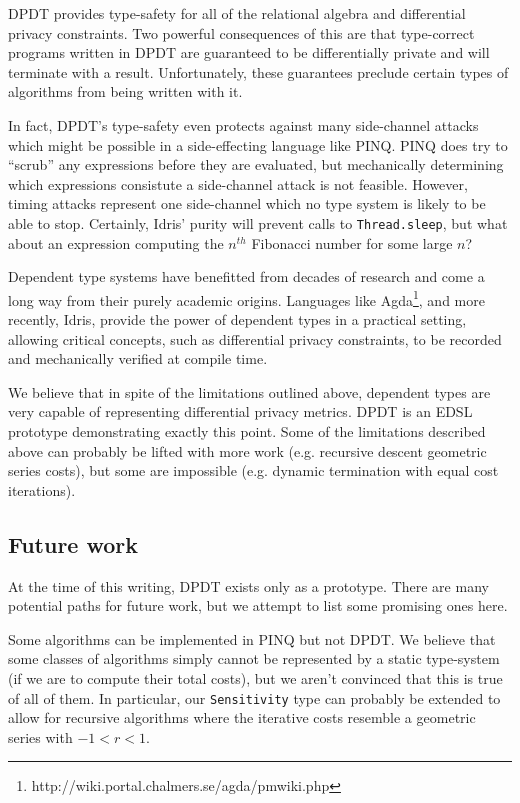 \documentclass[12pt]{article}
\begin{document}
DPDT provides type-safety for all of the relational algebra and differential privacy constraints.
Two powerful consequences of this are that type-correct programs written in DPDT are guaranteed to be differentially private and will terminate with a result.
Unfortunately, these guarantees preclude certain types of algorithms from being written with it.

In fact, DPDT's type-safety even protects against many side-channel attacks which might be possible in a side-effecting language like PINQ.
PINQ does try to ``scrub'' any expressions before they are evaluated, but mechanically determining which expressions consistute a side-channel attack is not feasible.
However, timing attacks represent one side-channel which no type system is likely to be able to stop.
Certainly, Idris' purity will prevent calls to \texttt{Thread.sleep}, but what about an expression computing the $n^{th}$ Fibonacci number for some large $n$?

Dependent type systems have benefitted from decades of research and come a long way from their purely academic origins.
Languages like Agda\footnote{http://wiki.portal.chalmers.se/agda/pmwiki.php}, and more recently, Idris, provide the power of dependent types in a practical setting, allowing critical concepts, such as differential privacy constraints, to be recorded and mechanically verified at compile time.

We believe that in spite of the limitations outlined above, dependent types are very capable of representing differential privacy metrics.
DPDT is an EDSL prototype demonstrating exactly this point.
Some of the limitations described above can probably be lifted with more work (e.g. recursive descent geometric series costs), but some are impossible (e.g. dynamic termination with equal cost iterations).

\subsection{Future work}\label{sec:future_work}

At the time of this writing, DPDT exists only as a prototype.
There are many potential paths for future work, but we attempt to list some promising ones here.

Some algorithms can be implemented in PINQ but not DPDT.
We believe that some classes of algorithms simply cannot be represented by a static type-system (if we are to compute their total costs), but we aren't convinced that this is true of all of them.
In particular, our \texttt{Sensitivity} type can probably be extended to allow for recursive algorithms where the iterative costs resemble a geometric series with $-1 < r < 1$.
\end{document}
